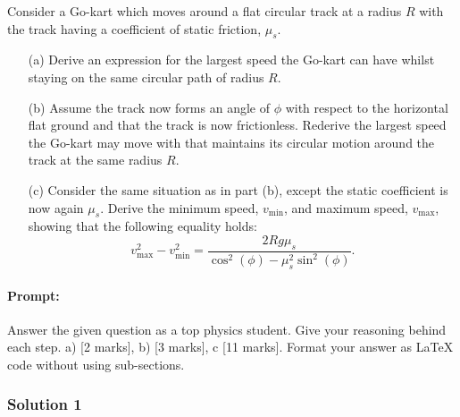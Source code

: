 \documentclass{article}
\begin{document}
Consider a Go-kart which moves around a flat circular track at a radius $R$ with the track having a coefficient of static friction, $\mu_s$.

\begin{enumerate}
    \item[(a)] Derive an expression for the largest speed the Go-kart can have whilst staying on the same circular path of radius $R$.
    
    \item[(b)] Assume the track now forms an angle of $\phi$ with respect to the horizontal flat ground and that the track is now frictionless. Rederive the largest speed the Go-kart may move with that maintains its circular motion around the track at the same radius $R$.
    
    \item[(c)] Consider the same situation as in part (b), except the static coefficient is now again $\mu_s$. Derive the minimum speed, $v_{\text{min}}$, and maximum speed, $v_{\text{max}}$, showing that the following equality holds:
    \[
    v^2_{\text{max}} - v^2_{\text{min}} = \frac{2R g \mu_s}{\cos^2(\phi) - \mu_s^2 \sin^2(\phi)}.
    \]
\end{enumerate}

\paragraph{Prompt: \\} 
Answer the given question as a top physics student. Give your reasoning behind each step. a) [2 marks], b) [3 marks], c [11 marks].
Format your answer as LaTeX code without using sub-sections.

\subsubsection{Solution 1}
\end{document}
